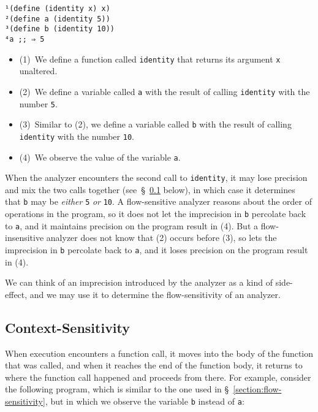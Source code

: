 \documentclass[12pt, oneside]{book}
\begin{document}
\begin{Verbatim}
¹(define (identity x) x)
²(define a (identity 5))
³(define b (identity 10))
⁴a ;; ⇒ 5
\end{Verbatim}

\begin{itemize}
  \item (1)~We define a function called \texttt{identity} that returns its argument \texttt{x} unaltered.
  \item (2)~We define a variable called \texttt{a} with the result of calling \texttt{identity} with the number \texttt{5}.
  \item (3)~Similar to (2), we define a variable called \texttt{b} with the result of calling \texttt{identity} with the number \texttt{10}.
  \item (4)~We observe the value of the variable \texttt{a}.
\end{itemize}

When the analyzer encounters the second call to \texttt{identity}, it may lose precision and mix the two calls together (see~§~\ref{section:context-sensitivity} below), in which case it determines that \texttt{b} may be \emph{either} \texttt{5} \emph{or} \texttt{10}. A flow-sensitive analyzer reasons about the order of operations in the program, so it does not let the imprecision in \texttt{b} percolate back to \texttt{a}, and it maintains precision on the program result in (4). But a flow-insensitive analyzer does not know that (2) occurs before (3), so lets the imprecision in \texttt{b} percolate back to \texttt{a}, and it loses precision on the program result in (4).

We can think of an imprecision introduced by the analyzer as a kind of side-effect, and we may use it to determine the flow-sensitivity of an analyzer.

\subsection{Context-Sensitivity}
\label{section:context-sensitivity}

When execution encounters a function call, it moves into the body of the function that was called, and when it reaches the end of the function body, it returns to where the function call happened and proceeds from there. For example, consider the following program, which is similar to the one used in §~\ref{section:flow-sensitivity}, but in which we observe the variable \texttt{b} instead of \texttt{a}:
\end{document}
